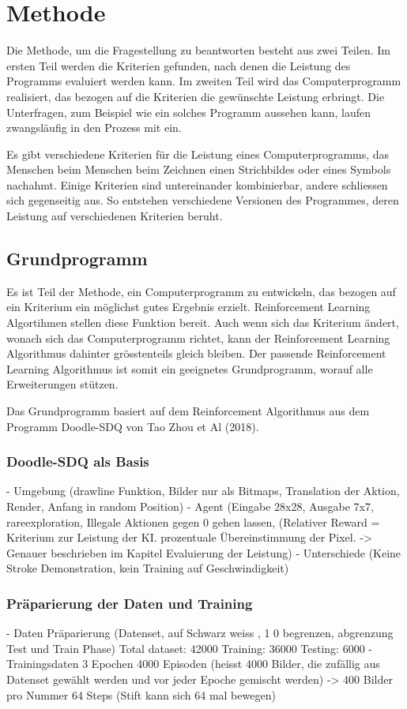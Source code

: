 \chapter{Methode}
Die Methode, um die Fragestellung zu beantworten besteht aus zwei Teilen. Im
ersten Teil werden die Kriterien gefunden, nach denen die Leistung des Programms
evaluiert werden kann. Im zweiten Teil wird das Computerprogramm realisiert, das
bezogen auf die Kriterien die gewünschte Leistung erbringt. Die Unterfragen, zum
Beispiel wie ein solches Programm aussehen kann, laufen zwangsläufig in den
Prozess mit ein. 

Es gibt verschiedene Kriterien für die Leistung eines Computerprogramms, das
Menschen beim Menschen beim Zeichnen einen Strichbildes oder eines Symbols
nachahmt. Einige Kriterien sind untereinander kombinierbar, andere schliessen
sich gegenseitig aus. So entstehen verschiedene Versionen des Programmes, deren
Leistung auf verschiedenen Kriterien beruht.


\section{Grundprogramm}
Es ist Teil der Methode, ein Computerprogramm zu entwickeln, das bezogen auf ein
Kriterium ein möglichst gutes Ergebnis erzielt. Reinforcement Learning
Algortihmen stellen diese Funktion bereit. Auch wenn sich das Kriterium ändert,
wonach sich das Computerprogramm richtet, kann der Reinforcement Learning
Algorithmus dahinter grösstenteils gleich bleiben. Der passende Reinforcement
Learning Algorithmus ist somit ein geeignetes Grundprogramm, worauf alle
Erweiterungen stützen.

Das Grundprogramm basiert auf dem Reinforcement Algorithmus aus dem Programm
Doodle-SDQ von Tao Zhou et Al (2018). 


\subsection*{Doodle-SDQ als Basis}
- Umgebung (drawline Funktion, Bilder nur als Bitmaps, Translation der Aktion, Render, Anfang in random Position)
- Agent (Eingabe 28x28, Ausgabe 7x7, rareexploration, Illegale Aktionen gegen 0 gehen lassen, (Relativer Reward = Kriterium zur Leistung der KI. prozentuale Übereinstimmung der Pixel. -> Genauer beschrieben im Kapitel Evaluierung der Leistung)
- Unterschiede (Keine Stroke Demonstration, kein Training auf Geschwindigkeit)

\subsection*{Präparierung der Daten und Training}
- Daten Präparierung (Datenset, auf Schwarz weiss , 1 0 begrenzen, abgrenzung Test und Train Phase)
    Total dataset: 42000
    Training: 36000
    Testing: 6000
- Trainingsdaten 
    3 Epochen
    4000 Episoden (heisst 4000 Bilder, die zufällig aus Datenset gewählt werden und vor jeder Epoche gemischt werden) -> 400 Bilder pro Nummer
    64 Steps (Stift kann sich 64 mal bewegen)

